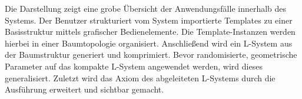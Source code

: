 Die Darstellung zeigt eine grobe Übersicht der Anwendungsfälle innerhalb des Systems.
Der Benutzer strukturiert vom System importierte Templates zu einer Basisstruktur mittels grafischer Bedienelemente.
Die Template-Instanzen werden hierbei in einer Baumtopologie organisiert.
Anschließend wird ein L-System aus der Baumstruktur generiert und komprimiert.
Bevor randomisierte, geometrische Parameter auf das kompakte L-System angewendet werden, wird dieses generalisiert.
Zuletzt wird das Axiom des abgeleiteten L-Systems durch die Ausführung erweitert und sichtbar gemacht.